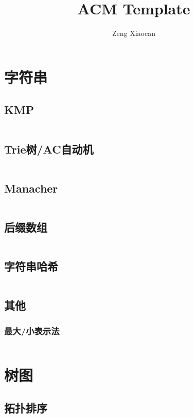\documentclass[a4paper,11pt]{article}
\author{Zeng Xiaocan}
\title{ACM Template}
\begin{document}
 
\maketitle %
\newpage %
\tableofcontents %
\newpage
\section{字符串}
\subsection{KMP}
\inputminted[]{c++}{Template/String/KMP.cpp}
\subsection{Trie树/AC自动机}
\inputminted[]{c++}{Template/String/TrieAC.cpp}
\subsection{Manacher}
\inputminted[]{c++}{Template/String/Manacher.cpp}
\subsection{后缀数组}
\inputminted[]{c++}{Template/String/Suffix-Array.cpp}
\subsection{字符串哈希}
\inputminted[]{c++}{Template/String/Hash.cpp}
\subsection{其他}
\subsubsection{最大/小表示法}
\inputminted[]{c++}{Template/String/Express.cpp}
\section{树图}
\subsection{拓扑排序}
\inputminted[]{c++}{Template/TreeGraph/TopoSort.cpp}
\end{document}
